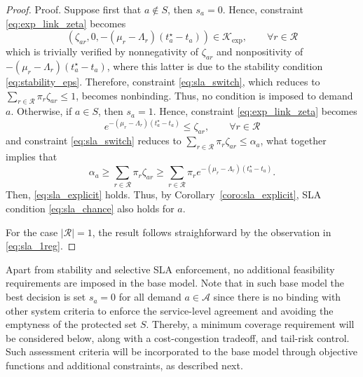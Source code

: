 \documentclass[letter,11pt, reqno]{amsart}
\def\A{\mathcal{A}}
\def\RR{\mathcal{R}}
\begin{document}
\begin{itemize}
\begin{proof}{Proof.}
    Suppose first that $a\notin S$, then $s_a=0$. Hence, constraint \eqref{eq:exp_link_zeta} becomes
    $$
    (\zeta_{ar},0, -(\mu_r-\Lambda_r)(t_a^\star-t_a))\in \mathcal{K}_{\exp}, \qquad \forall r\in\RR
    $$
    which is trivially verified by nonnegativity of $\zeta_{ar}$ and nonpositivity of $-(\mu_r-\Lambda_r)(t_a^\star-t_a)$, where this latter is due to the stability condition \eqref{eq:stability_eps}. Therefore, constraint \eqref{eq:sla_switch}, which reduces to
$\sum_{r\in\RR}\pi_r \zeta_{ar}\le 1$, becomes nonbinding. Thus, no condition is imposed to demand $a$. Otherwise, if $a\in S$, then $s_a=1$. Hence, constraint \eqref{eq:exp_link_zeta} becomes
$$
e^{-(\mu_r-\Lambda_r)(t_a^\star-t_a)}\le \zeta_{ar}, \qquad \forall r\in\RR
$$
and constraint \eqref{eq:sla_switch} reduces to $\sum_{r\in\RR}\pi_r \zeta_{ar}\le \alpha_a$, what together implies that
$$
\alpha_a \ge \sum_{r\in\RR}\pi_r \zeta_{ar} \ge \sum_{r\in\RR}\pi_r e^{-(\mu_r-\Lambda_r)(t_a^\star-t_a)}.
$$
Then, \eqref{eq:sla_explicit} holds. Thus, by Corollary~\ref{coro:sla_explicit}, SLA condition \eqref{eq:sla_chance} also holds for $a$.

For the case $|\RR|=1$, the result follows straighforward by the observation in \eqref{eq:sla_1reg}.%
\end{proof}

\end{itemize}

Apart from stability and selective SLA enforcement, no additional feasibility
requirements are imposed in the base model. Note that in such base model the best decision is set $s_a=0$ for all demand $a\in\A$ since there is no binding with other system criteria to enforce the service-level agreement and avoiding the emptyness of the protected set $S$. Thereby, a minimum coverage requirement will be considered below, along with a cost-congestion tradeoff, and tail-risk control. Such assessment criteria will be incorporated to the base model through objective functions and additional constraints, as described next.\\

\\
\end{document}
